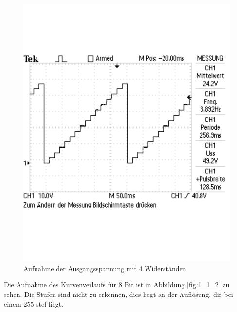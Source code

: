 \documentclass[12pt,a4paper]{article}
\begin{document}
\begin{figure}[H] 
  \centering 	
    \includegraphics[trim = 0mm 50mm 0mm 50mm, clip, scale = 0.4]{1_1_1.pdf}
  	\caption[Aufnahme der Ausgangsspannung mit 4 Widerständen]{Aufnahme der Ausgangsspannung mit 4 Widerständen} 
  \label{fig:1_1_1}
\end{figure}

Die Aufnahme des Kurvenverlaufs für 8 Bit ist in Abbildung \ref{fig:1_1_2} zu sehen. Die Stufen sind nicht zu erkennen, dies liegt an der Auflösung, die bei einem 255-stel liegt.
\end{document}
